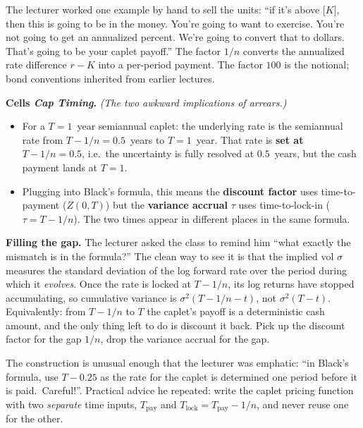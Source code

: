 The lecturer worked one example by hand to sell the units: ``if it's
above [$K$], then this is going to be in the money. You're going to
want to exercise. You're not going to get an annualized percent.
We're going to convert that to dollars. That's going to be your
caplet payoff.'' The factor $1/n$ converts the annualized rate
difference $r - K$ into a per-period payment. The factor $100$ is
the notional; bond conventions inherited from earlier lectures.

\begin{keyblock}
\textbf{Cells \emph{Cap Timing}.} \emph{(The two awkward implications
of arrears.)}
\begin{itemize}
  \item For a $T = 1$~year semiannual caplet: the underlying rate is
        the semiannual rate from $T - 1/n = 0.5$~years to
        $T = 1$~year. That rate is \textbf{set at $T - 1/n = 0.5$},
        i.e.\ the uncertainty is fully resolved at $0.5$~years, but
        the cash payment lands at $T = 1$.
  \item Plugging into Black's formula, this means the
        \textbf{discount factor} uses time-to-payment ($Z(0,T)$) but
        the \textbf{variance accrual} $\tau$ uses time-to-lock-in
        ($\tau = T - 1/n$). The two times appear in different places
        in the same formula.
\end{itemize}
\end{keyblock}

\begin{tipblock}
\textbf{Filling the gap.} The lecturer asked the class to remind him
``what exactly the mismatch is in the formula?'' The clean way to
see it is that the implied vol $\sigma$ measures the standard
deviation of the log forward rate over the period during which it
\emph{evolves}. Once the rate is locked at $T - 1/n$, its log returns
have stopped accumulating, so cumulative variance is $\sigma^2(T - 1/n
- t)$, not $\sigma^2(T - t)$. Equivalently: from $T - 1/n$ to $T$ the
caplet's payoff is a deterministic cash amount, and the only thing
left to do is discount it back. Pick up the discount factor for the
gap $1/n$, drop the variance accrual for the gap.
\end{tipblock}

The construction is unusual enough that the lecturer was emphatic:
``in Black's formula, use $T - 0.25$ as the rate for the caplet is
determined one period before it is paid.\ Careful!''. Practical
advice he repeated: write the caplet pricing function with two
\emph{separate} time inputs, $T_{\text{pay}}$ and
$T_{\text{lock}} = T_{\text{pay}} - 1/n$, and never reuse one for the
other.

